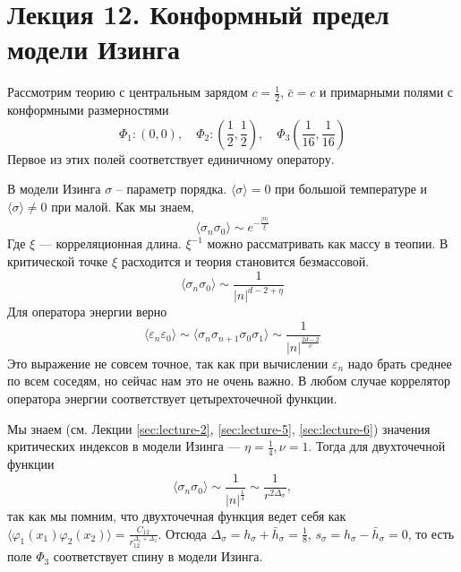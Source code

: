 \documentclass[a4paper,12pt]{article}
\theoremstyle{definition}
\theoremstyle{definition}
\theoremstyle{definition}
\begin{document}
\section{Лекция 12. Конформный предел модели Изинга}
\label{sec:lecture-12}

Рассмотрим теорию с центральным зарядом $c=\frac{1}{2}$, $\bar c=c$ и примарными полями с конформными размерностями
\begin{equation}
  \label{eq:276}
  \Phi_{1}: (0,0),\quad \Phi_{2}: \left(\frac{1}{2},\frac{1}{2}\right),\quad \Phi_{3}\left(\frac{1}{16},\frac{1}{16}\right)
\end{equation}
Первое из этих полей соответствует единичному оператору. 

В модели Изинга $\sigma$ -- параметр порядка. $\langle\sigma\rangle=0$ при большой температуре и $\langle \sigma\rangle\neq 0$ при малой. Как мы знаем,
\begin{equation}
  \label{eq:277}
  \langle \sigma_{n} \sigma_{0}\rangle\sim e^{-\frac{|n|}{\xi}}
\end{equation}
Где $\xi$ --- корреляционная длина. $\xi^{-1}$ можно рассматривать как массу в теопии. В критической точке $\xi$ расходится и теория становится безмассовой.
\begin{equation}
  \label{eq:278}
  \langle\sigma_{n}\sigma_{0}\rangle\sim\frac{1}{|n|^{d-2+\eta}}
\end{equation}
Для оператора энергии верно
\begin{equation}
  \label{eq:279}
  \langle \varepsilon_{n} \varepsilon_{0}\rangle \sim \langle\sigma_{n}\sigma_{n+1}\sigma_{0}\sigma_{1}\rangle\sim\frac{1}{|n|^{\frac{2d-2}{\nu}}}
\end{equation}
Это выражение не совсем точное, так как при вычислении $\varepsilon_{n}$ надо брать среднее по всем соседям, но сейчас нам это не очень важно. В любом случае коррелятор оператора энергии соответствует цетырехточечной функции. 

Мы знаем (см. Лекции \ref{sec:lecture-2}, \ref{sec:lecture-5}, \ref{sec:lecture-6}) значения критических индексов в модели Изинга --- $\eta=\frac{1}{4}, \nu=1$. Тогда для двухточечной функции
\begin{equation}
  \label{eq:280}
  \langle \sigma_{n} \sigma_{0} \rangle\sim \frac{1}{|n|^{\frac{1}{4}}} \sim\frac{1}{r^{2\Delta_{\sigma}}},
\end{equation}
так как мы помним, что двухточечная функция ведет себя как $\langle \varphi_{1}(x_{1}) \varphi_{2}(x_{2})\rangle=\frac{C_{12}}{r_{12}^{\Delta_{1}+\Delta_{2}}}$. Отсюда $\Delta_{\sigma}=h_{\sigma}+\bar h_{\sigma}=\frac{1}{8}$, $s_{\sigma}=h_{\sigma}-\bar h_{\sigma}=0$, то есть поле $\Phi_{3}$ соответствует спину в модели Изинга. 
\end{document}
